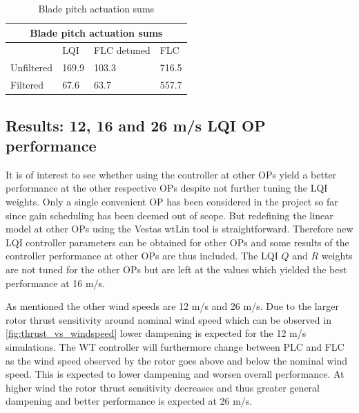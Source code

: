 \begin{table}[t]
	\centering
	\caption{Blade pitch actuation sums}
	\label{tab:pitch_sum}
	\begin{tabular}{@{}|llll|@{}}
		\toprule
		\multicolumn{4}{|c|}{Blade pitch actuation sums}                                                                                                   \\ \midrule
		\multicolumn{1}{|l|}{}           & \multicolumn{1}{l|}{LQI}   & \multicolumn{1}{l|}{FLC detuned}                   & FLC                           \\ \midrule
		\multicolumn{1}{|l|}{Unfiltered} & \multicolumn{1}{l|}{169.9} & \multicolumn{1}{l|}{\cellcolor[HTML]{9AFF99}103.3} & \cellcolor[HTML]{FFCCC9}716.5 \\ \midrule
		\multicolumn{1}{|l|}{Filtered}   & \multicolumn{1}{l|}{67.6}  & \multicolumn{1}{l|}{\cellcolor[HTML]{9AFF99}63.7}  & \cellcolor[HTML]{FFCCC9}557.7 \\ \bottomrule
	\end{tabular}
\end{table}

\subsection{Results: 12, 16 and 26 m/s LQI OP performance} \label{sec:test_vts_part2}
It is of interest to see whether using the controller at other OPs yield a better performance at the other respective OPs despite not further tuning the LQI weights. Only a single convenient OP has been considered in the project so far since gain scheduling has been deemed out of scope. But redefining the linear model at other OPs using the Vestas wtLin tool is straightforward. Therefore new LQI controller parameters can be obtained for other OPs and some results of the controller performance at other OPs are thus included. The LQI $ Q $ and $ R $ weights are not tuned for the other OPs but are left at the values which yielded the best performance at 16 m/s.

As mentioned the other wind speeds are 12 m/s and 26 m/s. Due to the larger rotor thrust sensitivity around nominal wind speed which can be observed in \cref{fig:thrust_vs_windspeed} lower dampening is expected for the 12 m/s simulations. The WT controller will furthermore change between PLC and FLC as the wind speed observed by the rotor goes above and below the nominal wind speed. This is expected to lower dampening and worsen overall performance. At higher wind the rotor thrust sensitivity decreases and thus greater general dampening and better performance is expected at 26 m/s.

